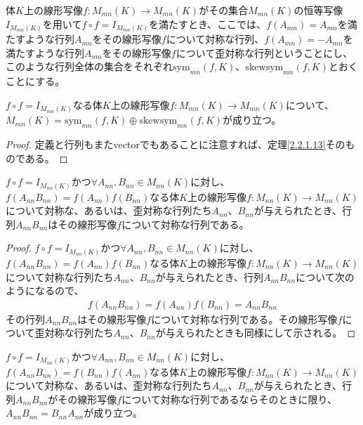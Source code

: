 \documentclass[dvipdfmx]{jsarticle}
\begin{document}
\begin{dfn}
体$K$上の線形写像$f:M_{mn}(K) \rightarrow M_{mn}(K)$がその集合$M_{mn}(K)$の恒等写像$I_{M_{mn}(K)}$を用いて$f \circ f = I_{M_{mn}(K)}$を満たすとき、ここでは、$f\left( A_{mn} \right) = A_{mn}$を満たすような行列$A_{mn}$をその線形写像$f$について対称な行列、$f\left( A_{mn} \right) = - A_{mn}$を満たすような行列$A_{mn}$をその線形写像$f$について歪対称な行列ということにし、このような行列全体の集合をそれぞれ${\mathrm{sym} }_{mn}(f,K)$、${\mathrm{skew}}{{\mathrm{sym} }_{mn}(f,K)}$とおくことにする。
\end{dfn}
\begin{thm}\label{2.2.1.15}
$f \circ f = I_{M_{mn}(K)}$なる体$K$上の線形写像$f:M_{mn}(K) \rightarrow M_{mn}(K)$について、$M_{mn}(K) = {\mathrm{sym} }_{mn}(f,K) \oplus {\mathrm{skew}}{{\mathrm{sym} }_{mn}(f,K)}$が成り立つ。
\end{thm}
\begin{proof} 定義と行列もまたvectorでもあることに注意すれば、定理\ref{2.2.1.13}そのものである。
\end{proof}
\begin{thm}\label{2.2.1.16}
$f \circ f = I_{M_{nn}(K)}$かつ$\forall A_{nn},B_{nn} \in M_{nn}(K)$に対し、$f\left( A_{nn}B_{nn} \right) = f\left( A_{nn} \right)f\left( B_{nn} \right)$なる体$K$上の線形写像$f:M_{nn}(K) \rightarrow M_{nn}(K)$について対称な、あるいは、歪対称な行列たち$A_{nn}$、$B_{nn}$が与えられたとき、行列$A_{nn}B_{nn}$はその線形写像$f$について対称な行列である。
\end{thm}
\begin{proof}
$f \circ f = I_{M_{nn}(K)}$かつ$\forall A_{nn},B_{nn} \in M_{nn}(K)$に対し、$f\left( A_{nn}B_{nn} \right) = f\left( A_{nn} \right)f\left( B_{nn} \right)$なる体$K$上の線形写像$f:M_{nn}(K) \rightarrow M_{nn}(K)$について対称な行列たち$A_{nn}$、$B_{nn}$が与えられたとき、行列$A_{nn}B_{nn}$について次のようになるので、
\begin{align*}
f\left( A_{nn}B_{nn} \right) = f\left( A_{nn} \right)f\left( B_{nn} \right) = A_{nn}B_{nn}
\end{align*}
その行列$A_{nn}B_{nn}$はその線形写像$f$について対称な行列である。その線形写像$f$について歪対称な行列たち$A_{nn}$、$B_{nn}$が与えられたときも同様にして示される。
\end{proof}
\begin{thm}\label{2.2.1.17}
$f \circ f = I_{M_{nn}(K)}$かつ$\forall A_{nn},B_{nn} \in M_{nn}(K)$に対し、$f\left( A_{nn}B_{nn} \right) = f\left( B_{nn} \right)f\left( A_{nn} \right)$なる体$K$上の線形写像$f:M_{nn}(K) \rightarrow M_{nn}(K)$について対称な、あるいは、歪対称な行列たち$A_{nn}$、$B_{nn}$が与えられたとき、行列$A_{nn}B_{nn}$がその線形写像$f$について対称な行列であるならそのときに限り、$A_{nn}B_{nn} = B_{nn}A_{nn}$が成り立つ。
\end{thm}
\end{document}

